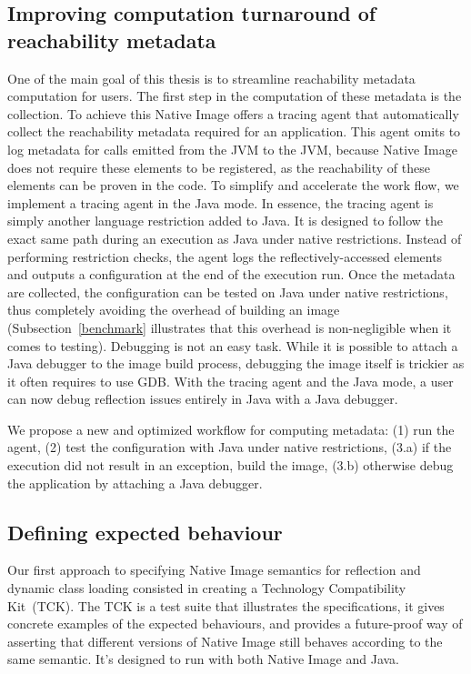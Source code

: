 \subsection{Improving computation turnaround of reachability metadata}
One of the main goal of this thesis is to streamline reachability metadata computation for users.
The first step in the computation of these metadata is the collection. To achieve this Native Image offers a tracing agent that automatically collect the reachability metadata required for an application. This agent omits to log metadata for calls emitted from the JVM to the JVM, because Native Image does not require these elements to be registered, as the reachability of these elements can be proven in the code.  
To simplify and accelerate the work flow, we implement a tracing agent in the Java mode. In essence, the tracing agent is simply another language restriction added to Java. It is designed to follow the exact same path during an execution as Java under native restrictions. Instead of performing restriction checks, the agent logs the reflectively-accessed elements and outputs a configuration at the end of the execution run. 
Once the metadata are collected, the configuration can be tested on Java under native restrictions, thus completely avoiding the overhead of building an image (Subsection~\ref{benchmark} illustrates that this overhead is non-negligible when it comes to testing).  
Debugging is not an easy task. While it is possible to attach a Java debugger to the image build process, debugging the image itself is trickier as it often requires to use GDB. With the tracing agent and the Java mode, a user can now debug reflection issues entirely in Java with a Java debugger. 

We propose a new and optimized workflow for computing metadata: (1) run the agent, (2) test the configuration with Java under native restrictions, (3.a) if the execution did not result in an exception, build the image, (3.b) otherwise debug the application by attaching a Java debugger.

\subsection{Defining expected behaviour}
Our first approach to specifying Native Image semantics for reflection and dynamic class loading consisted in creating a Technology Compatibility Kit~(TCK). The TCK is a test suite that illustrates the specifications, it gives concrete examples of the expected behaviours, and provides a future-proof way of asserting that different versions of Native Image still behaves according to the same semantic.
It's designed to run with both Native Image and Java.

